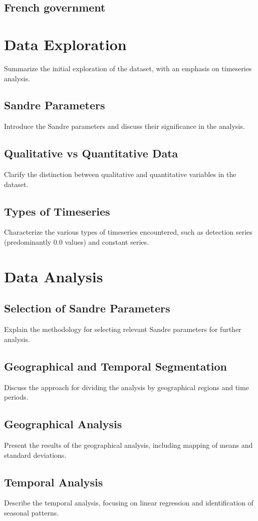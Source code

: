 \documentclass{article}
\begin{document}
\subsection{French government }

\section{Data Exploration}
Summarize the initial exploration of the dataset, with an emphasis on timeseries analysis.
\subsection{Sandre Parameters}
Introduce the Sandre parameters and discuss their significance in the analysis.
\subsection{Qualitative vs Quantitative Data}
Clarify the distinction between qualitative and quantitative variables in the dataset.
\subsection{Types of Timeseries}
Characterize the various types of timeseries encountered, such as detection series (predominantly 0.0 values) and constant series.

\section{Data Analysis}
\subsection{Selection of Sandre Parameters}
Explain the methodology for selecting relevant Sandre parameters for further analysis.
\subsection{Geographical and Temporal Segmentation}
Discuss the approach for dividing the analysis by geographical regions and time periods.
\subsection{Geographical Analysis}
Present the results of the geographical analysis, including mapping of means and standard deviations.
\subsection{Temporal Analysis}
Describe the temporal analysis, focusing on linear regression and identification of seasonal patterns.
\end{document}
